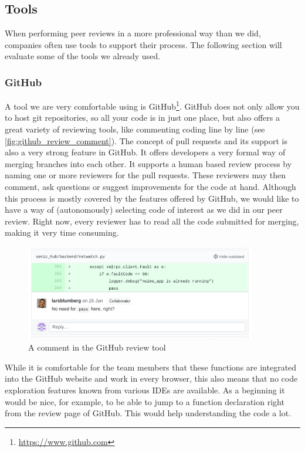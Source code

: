 \documentclass{scrreprt}
\begin{document}
\subsection{Tools}

When performing peer reviews in a more professional way than we did, companies often use tools to support their process. The following section will evaluate some of the tools we already used.

\subsubsection{GitHub}

A tool we are very comfortable using is GitHub\footnote{\url{https://www.github.com}}. GitHub does not only allow you to host git repositories, so all your code is in just one place, but also offers a great variety of reviewing tools, like commenting coding line by line (see \vref{fig:github_review_comment}). The concept of pull requests and its support is also a very strong feature in GitHub. It offers developers a very formal way of merging branches into each other. It supports a human based review process by naming one or more reviewers for the pull requests. These reviewers may then comment, ask questions or suggest improvements for the code at hand. Although this process is mostly covered by the features offered by GitHub, we would like to have a way of (autonomously) selecting code of interest as we did in our peer review. Right now, every reviewer has to read all the code submitted for merging, making it very time consuming.

\begin{figure}[h]
	\centering
	\includegraphics[width=0.9\textwidth]{img/github_review_comment}
	\caption[GitHub Review Comment]{A comment in the GitHub review tool}
	\label{fig:github_review_comment}
\end{figure}

While it is comfortable for the team members that these functions are integrated into the GitHub website and work in every browser, this also means that no code exploration features known from various IDEs are available. As a beginning it would be nice, for example, to be able to jump to a function declaration right from the review page of GitHub. This would help understanding the code a lot.
\end{document}
